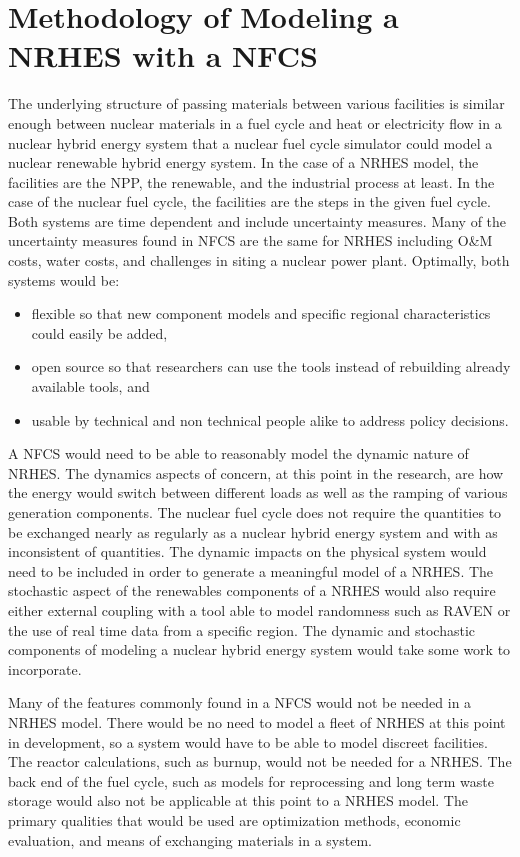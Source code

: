 \documentclass[12pt]{UIdahoMastersThesis}
\begin{document}
\chapter{Methodology of Modeling a NRHES with a NFCS}
The underlying structure of passing materials between various facilities is similar enough between nuclear materials in a fuel cycle and heat or electricity flow in a nuclear hybrid energy system that a nuclear fuel cycle simulator could model a nuclear renewable hybrid energy system. In the case of a NRHES model, the facilities are the NPP, the renewable, and the industrial process at least.  In the case of the nuclear fuel cycle, the facilities are the steps in the given fuel cycle. Both systems are time dependent and include uncertainty measures. Many of the uncertainty measures found in NFCS are the same for NRHES including O\&M costs, water costs, and challenges in siting a nuclear power plant. Optimally, both systems would be:
\begin{itemize}

\item flexible so that new component models and specific regional characteristics could easily be added,
\item open source so that researchers can use the tools instead of rebuilding already available tools, and
\item usable by technical and non technical people alike to address policy decisions.

\end{itemize}

A NFCS would need to be able to reasonably model the dynamic nature of NRHES. The dynamics aspects of concern, at this point in the research, are how the energy would switch between different loads as well as the ramping of various generation components.  The nuclear fuel cycle does not require the quantities to be exchanged nearly as regularly as a nuclear hybrid energy system and with as inconsistent of quantities. The dynamic impacts on the physical system would need to be included in order to generate a meaningful model of a NRHES. The stochastic aspect of the renewables components of a NRHES would also require either external coupling with a tool able to model randomness such as RAVEN or the use of real time data from a specific region. The dynamic and stochastic components of modeling a nuclear hybrid energy system would take some work to incorporate.

Many of the features commonly found in a NFCS would not be needed in a NRHES model.  There would be no need to model a fleet of NRHES at this point in development, so a system would have to be able to model discreet facilities.  The reactor calculations, such as burnup, would not be needed for a NRHES.  The back end of the fuel cycle, such as models for reprocessing and long term waste storage would also not be applicable at this point to a NRHES model.  The primary qualities that would be used are optimization methods, economic evaluation, and means of exchanging materials in a system.
\end{document}
